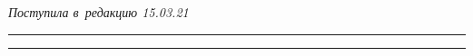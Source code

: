 










\vspace*{-3pt}





\hfill{\small\textit{Поступила в~редакцию 15.03.21}}














\vspace*{6pt}





\hrule





\vspace*{2pt}















\hrule





\vspace*{8pt}





\def\tit{ANALYTICAL MODEL\\ OF~CARRIER SENSE MULTIPLE ACCESS PROTOCOL\\ 


FOR~INDUSTRIAL INTERNET OF~THINGS APPLICATIONS}





\def\titkol{Analytical model of~carrier sense multiple access protocol 


for~IIoT applications}











